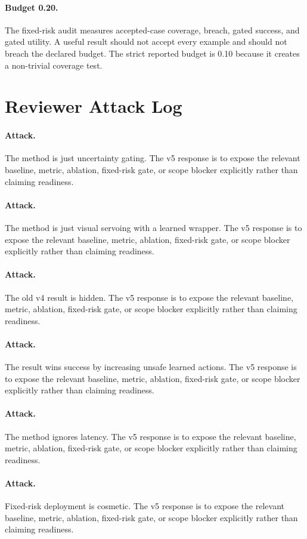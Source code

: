 \documentclass{article}
\begin{document}
\paragraph{Budget 0.20.} The fixed-risk audit measures accepted-case coverage, breach, gated success, and gated utility. A useful result should not accept every example and should not breach the declared budget. The strict reported budget is 0.10 because it creates a non-trivial coverage test.
\section{Reviewer Attack Log}
\paragraph{Attack.} The method is just uncertainty gating. The v5 response is to expose the relevant baseline, metric, ablation, fixed-risk gate, or scope blocker explicitly rather than claiming readiness.
\paragraph{Attack.} The method is just visual servoing with a learned wrapper. The v5 response is to expose the relevant baseline, metric, ablation, fixed-risk gate, or scope blocker explicitly rather than claiming readiness.
\paragraph{Attack.} The old v4 result is hidden. The v5 response is to expose the relevant baseline, metric, ablation, fixed-risk gate, or scope blocker explicitly rather than claiming readiness.
\paragraph{Attack.} The result wins success by increasing unsafe learned actions. The v5 response is to expose the relevant baseline, metric, ablation, fixed-risk gate, or scope blocker explicitly rather than claiming readiness.
\paragraph{Attack.} The method ignores latency. The v5 response is to expose the relevant baseline, metric, ablation, fixed-risk gate, or scope blocker explicitly rather than claiming readiness.
\paragraph{Attack.} Fixed-risk deployment is cosmetic. The v5 response is to expose the relevant baseline, metric, ablation, fixed-risk gate, or scope blocker explicitly rather than claiming readiness.
\end{document}
